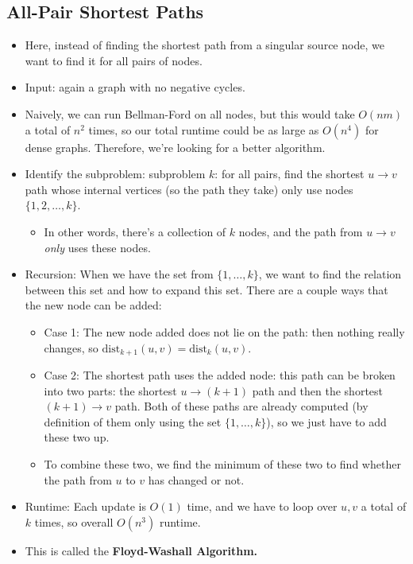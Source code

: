 \documentclass[10pt]{article}
\newcommand{\dist}{\mathrm{dist}}
\begin{document}
	\subsection{All-Pair Shortest Paths}
	\begin{itemize}
		\item Here, instead of finding the shortest path from a singular source node, we want to find 
			it for all pairs of nodes. 
		\item Input: again a graph with no negative cycles.
		\item Naively, we can run Bellman-Ford on all nodes, but this would take $O(nm)$ a total 
			of $n^2$ times, so our total runtime could be as large as $O(n^4)$ for dense graphs.
			Therefore, we're looking for a better algorithm.
		\item Identify the subproblem: subproblem $k$: for all pairs, find the shortest $u \to v$ path 
			whose internal vertices (so the path they take) only use nodes $\{1, 2, \dots, k\}$.
			\begin{itemize}
				\item In other words, there's a collection of $k$ nodes, and the path from $u \to v$ 
					\textit{only} uses these nodes.
			\end{itemize}
		\item Recursion: When we have the set from $\{1, \dots, k\}$, we want to find the relation between 
			this set and how to expand this set. There are a couple ways that the new 
			node can be added:
			\begin{itemize}
				\item Case 1: The new node added does not lie on the path: then nothing really changes, so 
					$\dist_{k +1}(u, v) = \dist_k(u, v)$.
				\item Case 2: The shortest path uses the added node: this path can be broken into two 
					parts: the shortest $u \to (k+1)$ path and then the shortest $(k+1) \to v$ path. 
					Both of these paths are already computed (by definition of them only using 
					the set $\{1, \dots, k\} $), so we just have to add these two up. 
				\item To combine these two, we find the minimum of these two to find whether the 
					path from $u$ to $v$ has changed or not.  
			\end{itemize}
		\item Runtime: Each update is $O(1)$ time, and we have to loop over $u, v$ a total of $k$ times, 
			so overall $O(n^3)$ runtime. 
		\item This is called the \textbf{Floyd-Washall Algorithm.}
	\end{itemize}
	
	
	
	
	
	
	
	
\end{document}
